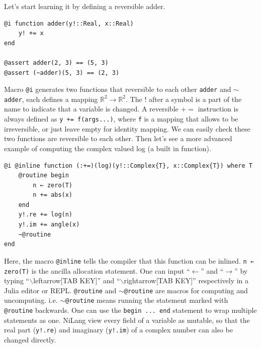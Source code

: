 \documentclass{article}
\newcommand{\<}{\langle}
\renewcommand{\>}{\rangle}
\theoremstyle{definition}\newtheorem{definition}{\textit{Definition}}
\begin{document}
Let's start learning it by defining a reversible adder.

\begin{minipage}{.88\columnwidth}
\begin{lstlisting}[mathescape=true,caption={A reversible adder},label={lst:adder}]
@i function adder(y!::Real, x::Real)
    y! += x
end

@assert adder(2, 3) == (5, 3)
@assert (~adder)(5, 3) == (2, 3)
\end{lstlisting}
\end{minipage}

Macro \texttt{@i} generates two functions that reversible to each other \texttt{adder} and \texttt{$\sim$adder}, each defines a mapping $\mathbb{R}^2 \rightarrow \mathbb{R}^2$. The $!$ after a symbol is a part of the name to indicate that a variable is changed.
A reversible $\mathrel{+}=$ instruction is always defined as \texttt{y += f(args...)}, where \texttt{f} is a mapping that allows to be irreversible, or just leave empty for identity mapping.
We can easily check these two functions are reversible to each other.
Then let's see a more advanced example of computing the complex valued log (a built in function).

\begin{minipage}{.88\columnwidth}
\begin{lstlisting}[mathescape=true,caption={Reversible complex valued log function $y\mathrel{+}=\log(|x|) + i{\rm Arg}(x)$.},label={lst:complex}]
@i @inline function (:+=)(log)(y!::Complex{T}, x::Complex{T}) where T
    @routine begin
        n ← zero(T)
        n += abs(x)
    end
    y!.re += log(n)
    y!.im += angle(x)
    ~@routine
end
\end{lstlisting}
\end{minipage}

Here, the macro \texttt{@inline} tells the compiler that this function can be inlined. \texttt{n ← zero(T)} is the ancilla allocation statement. One can input ``$\leftarrow$'' and ``$\rightarrow$'' by typing ``$\backslash$leftarrow[TAB KEY]'' and ``$\backslash$rightarrow[TAB KEY]'' respectively in a Julia editor or REPL.
\texttt{@routine} and \texttt{$\sim$@routine} are macros for computing and uncomputing. i.e. \texttt{$\sim$@routine} means running the statement marked with \texttt{@routine} backwards.
One can use the \texttt{begin ... end} statement to wrap multiple statements as one.
NiLang view every field of a variable as mutable, so that the real part (\texttt{y!.re}) and imaginary (\texttt{y!.im}) of a complex number can also be changed directly.
\end{document}
